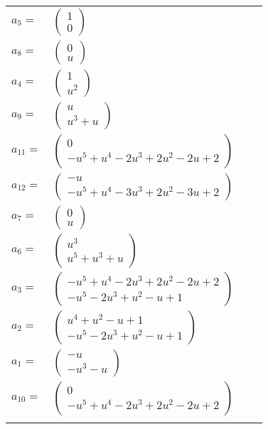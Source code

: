 \documentclass[1p]{elsarticle_modified}
\theoremstyle{definition}
\begin{document}
\begin{tabular}{m{7pt} m{180pt} m{7pt} m{180pt} }
\flushright $a_{5}=$&$\begin{pmatrix}1\\0\end{pmatrix}$ \\
\flushright $a_{8}=$&$\begin{pmatrix}0\\u\end{pmatrix}$ \\
\flushright $a_{4}=$&$\begin{pmatrix}1\\u^2\end{pmatrix}$ \\
\flushright $a_{9}=$&$\begin{pmatrix}u\\u^3+u\end{pmatrix}$ \\
\flushright $a_{11}=$&$\begin{pmatrix}0\\- u^5+u^4-2 u^3+2 u^2-2 u+2\end{pmatrix}$ \\
\flushright $a_{12}=$&$\begin{pmatrix}- u\\- u^5+u^4-3 u^3+2 u^2-3 u+2\end{pmatrix}$ \\
\flushright $a_{7}=$&$\begin{pmatrix}0\\u\end{pmatrix}$ \\
\flushright $a_{6}=$&$\begin{pmatrix}u^3\\u^5+u^3+u\end{pmatrix}$ \\
\flushright $a_{3}=$&$\begin{pmatrix}- u^5+u^4-2 u^3+2 u^2-2 u+2\\- u^5-2 u^3+u^2- u+1\end{pmatrix}$ \\
\flushright $a_{2}=$&$\begin{pmatrix}u^4+u^2- u+1\\- u^5-2 u^3+u^2- u+1\end{pmatrix}$ \\
\flushright $a_{1}=$&$\begin{pmatrix}- u\\- u^3- u\end{pmatrix}$ \\
\flushright $a_{10}=$&$\begin{pmatrix}0\\- u^5+u^4-2 u^3+2 u^2-2 u+2\end{pmatrix}$\\&\end{tabular}
\end{document}
